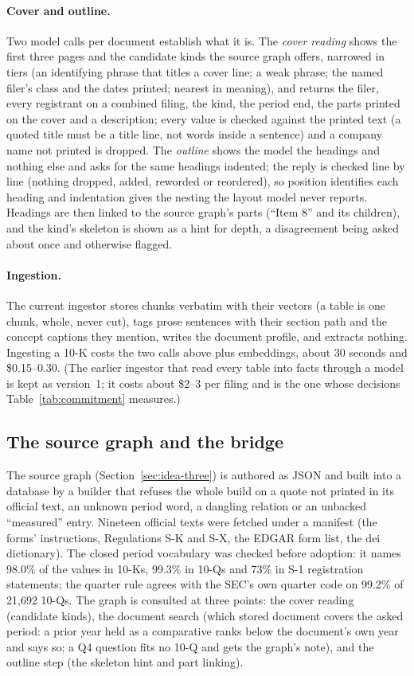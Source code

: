 \paragraph{Cover and outline.}
Two model calls per document establish what it is. The \emph{cover reading} shows the first three pages and the candidate kinds the source graph offers, narrowed in tiers (an identifying phrase that titles a cover line; a weak phrase; the named filer's class and the dates printed; nearest in meaning), and returns the filer, every registrant on a combined filing, the kind, the period end, the parts printed on the cover and a description; every value is checked against the printed text (a quoted title must be a title line, not words inside a sentence) and a company name not printed is dropped. The \emph{outline} shows the model the headings and nothing else and asks for the same headings indented; the reply is checked line by line (nothing dropped, added, reworded or reordered), so position identifies each heading and indentation gives the nesting the layout model never reports. Headings are then linked to the source graph's parts (``Item 8'' and its children), and the kind's skeleton is shown as a hint for depth, a disagreement being asked about once and otherwise flagged.

\paragraph{Ingestion.}
The current ingestor stores chunks verbatim with their vectors (a table is one chunk, whole, never cut), tags prose sentences with their section path and the concept captions they mention, writes the document profile, and extracts nothing. Ingesting a 10-K costs the two calls above plus embeddings, about 30 seconds and \$0.15--0.30. (The earlier ingestor that read every table into facts through a model is kept as version~1; it costs about \$2--3 per filing and is the one whose decisions Table~\ref{tab:commitment} measures.)

\subsection{The source graph and the bridge}
\label{sec:impl-source}

The source graph (Section~\ref{sec:idea-three}) is authored as JSON and built into a database by a builder that refuses the whole build on a quote not printed in its official text, an unknown period word, a dangling relation or an unbacked ``measured'' entry. Nineteen official texts were fetched under a manifest (the forms' instructions, Regulations S-K and S-X, the EDGAR form list, the dei dictionary). The closed period vocabulary was checked before adoption: it names 98.0\% of the values in 10-Ks, 99.3\% in 10-Qs and 73\% in S-1 registration statements; the quarter rule agrees with the SEC's own quarter code on 99.2\% of 21,692 10-Qs. The graph is consulted at three points: the cover reading (candidate kinds), the document search (which stored document covers the asked period: a prior year held as a comparative ranks below the document's own year and says so; a Q4 question fits no 10-Q and gets the graph's note), and the outline step (the skeleton hint and part linking).

